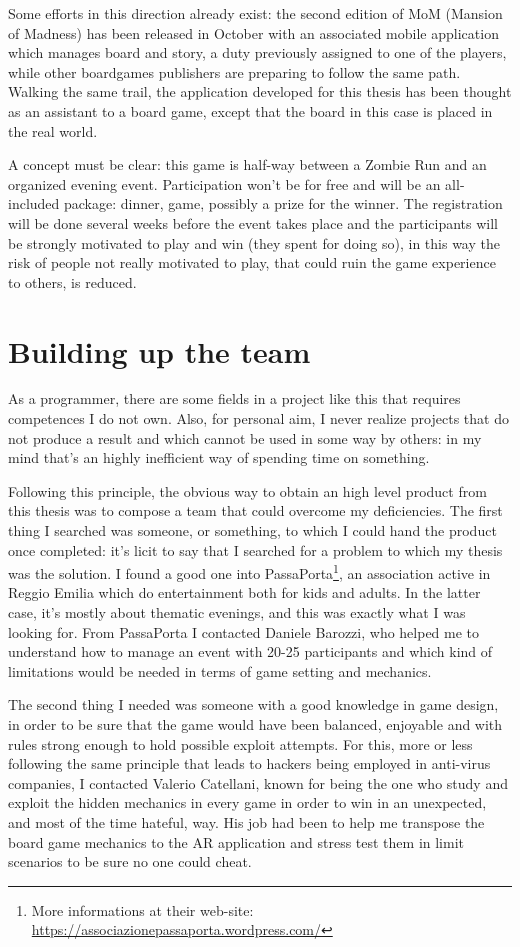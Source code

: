 		Some efforts in this direction already exist: the second edition of MoM (Mansion of Madness) has been released in October with an associated mobile application which manages board and story, a duty previously assigned to one of the players, while other boardgames publishers are preparing to follow the same path.
		Walking the same trail, the application developed for this thesis has been thought as an assistant to a board game, except that the board in this case is placed in the real world.
		
		A concept must be clear: this game is half-way between a Zombie Run and an organized evening event.
		Participation won't be for free and will be an all-included package: dinner, game, possibly a prize for the winner.
		The registration will be done several weeks before the event takes place and the participants will be strongly motivated to play and win (they spent for doing so), in this way the risk of people not really motivated to play, that could ruin the game experience to others, is reduced.
	
	\section{Building up the team}
		
		As a programmer, there are some fields in a project like this that requires competences I do not own.
		Also, for personal aim, I never realize projects that do not produce a result and which cannot be used in some way by others: in my mind that's an highly inefficient way of spending time on something.
		
		Following this principle, the obvious way to obtain an high level product from this thesis was to compose a team that could overcome my deficiencies.
		The first thing I searched was someone, or something, to which I could hand the product once completed: it's licit to say that I searched for a problem to which my thesis was the solution.
		I found a good one into PassaPorta\footnote{More informations at their web-site: \url{ https://associazionepassaporta.wordpress.com/}}, an association active in Reggio Emilia which do entertainment both for kids and adults.
		In the latter case, it's mostly about thematic evenings, and this was exactly what I was looking for.
		From PassaPorta I contacted Daniele Barozzi, who helped me to understand how to manage an event with 20-25 participants and which kind of limitations would be needed in terms of game setting and mechanics.
		
		The second thing I needed was someone with a good knowledge in game design, in order to be sure that the game would have been balanced, enjoyable and with rules strong enough to hold possible exploit attempts.
		For this, more or less following the same principle that leads to hackers being employed in anti-virus companies, I contacted Valerio Catellani, known for being the one who study and exploit the hidden mechanics in every game in order to win in an unexpected, and most of the time hateful, way. His job had been to help me transpose the board game mechanics to the AR application and stress test them in limit scenarios to be sure no one could cheat.
		
